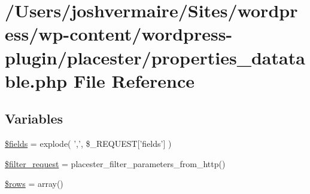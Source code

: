 \hypertarget{properties__datatable_8php}{
\section{/Users/joshvermaire/Sites/wordpress/wp-\/content/wordpress-\/plugin/placester/properties\_\-datatable.php File Reference}
\label{d7/da4/properties__datatable_8php}
}
\subsection*{Variables}
\begin{DoxyCompactItemize}
\item 
\hyperlink{properties__datatable_8php_ab2303c817e3b402b77b7f99627b9c319}{\$fields} = explode( ',', \$\_\-REQUEST\mbox{[}'fields'\mbox{]} )
\item 
\hyperlink{properties__datatable_8php_a867e2cebab27257f0c333daace141858}{\$filter\_\-request} = placester\_\-filter\_\-parameters\_\-from\_\-http()
\item 
\hyperlink{properties__datatable_8php_ace2ec39e7df3899fa8df9640ec274b03}{\$rows} = array()
\end{DoxyCompactItemize}


